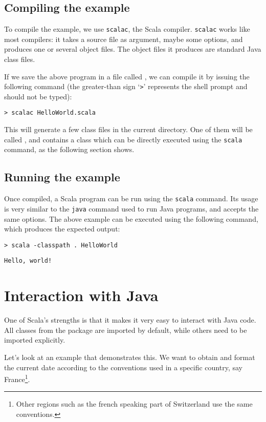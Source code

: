 \documentclass[a4paper,12pt,twoside,titlepage]{article}
\newcommand{\langname}[1]{#1\xspace}
\newcommand{\Scala}{\langname{Scala}}
\newcommand{\Java}{\langname{Java}}
\newcommand{\toolname}[1]{\texttt{#1}\xspace}
\newcommand{\scalac}{\toolname{scalac}}
\newcommand{\scala}{\toolname{scala}}
\newcommand{\java}{\toolname{java}}
\begin{document}
\subsection{Compiling the example}
\label{sec:compiling-example}

To compile the example, we use \scalac, the \Scala compiler. \scalac
works like most compilers: it takes a source file as argument, maybe
some options, and produces one or several object files. The object
files it produces are standard \Java class files.

If we save the above program in a file called
, we can compile it by issuing the following
command (the greater-than sign `\verb|>|' represents the shell prompt
and should not be typed):
\begin{verbatim}
> scalac HelloWorld.scala
\end{verbatim}
This will generate a few class files in the current directory. One of
them will be called , and contains a class
which can be directly executed using the \scala command, as the
following section shows.

\subsection{Running the example}
\label{sec:running-example}

Once compiled, a \Scala program can be run using the \scala command.
Its usage is very similar to the \java command used to run \Java
programs, and accepts the same options. The above example can be
executed using the following command, which produces the expected
output:
\begin{verbatim}
> scala -classpath . HelloWorld
\end{verbatim}
\begin{verbatim}
Hello, world!
\end{verbatim}

\section{Interaction with Java}
\label{sec:inter-with-java}

One of \Scala's strengths is that it makes it very easy to interact
with \Java code. All classes from the  package are
imported by default, while others need to be imported explicitly.

Let's look at an example that demonstrates this.  We want to obtain
and format the current date according to the conventions used in a
specific country, say France\footnote{Other regions such as the french
  speaking part of Switzerland use the same conventions.}.
\end{document}
